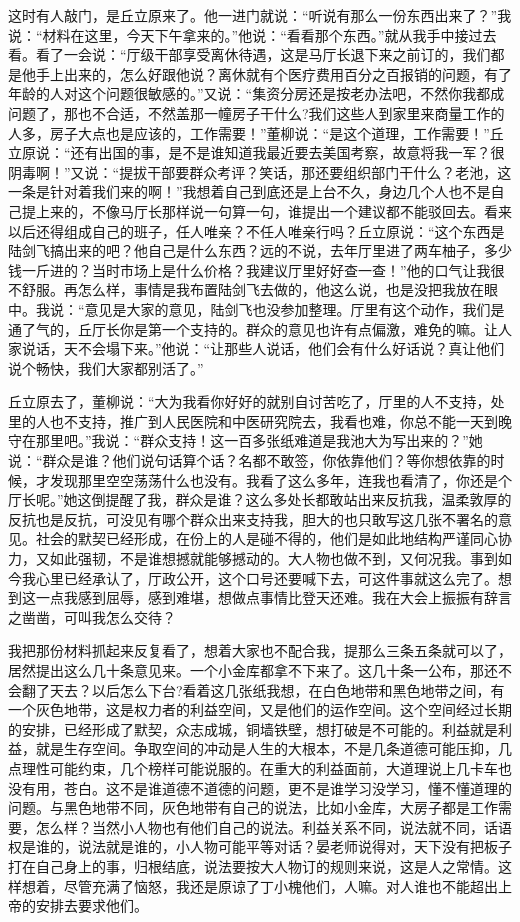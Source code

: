 \documentclass[12pt,oneside]{book}
\begin{document}
这时有人敲门，是丘立原来了。他一进门就说：``听说有那么一份东西出来了？''我说：``材料在这里，今天下午拿来的。''他说：``看看那个东西。''就从我手中接过去看。看了一会说：``厅级干部享受离休待遇，这是马厅长退下来之前订的，我们都是他手上出来的，怎么好跟他说？离休就有个医疗费用百分之百报销的问题，有了年龄的人对这个问题很敏感的。''又说：``集资分房还是按老办法吧，不然你我都成问题了，那也不合适，不然盖那一幢房子干什么?我们这些人到家里来商量工作的人多，房子大点也是应该的，工作需要！''董柳说：``是这个道理，工作需要！''丘立原说：``还有出国的事，是不是谁知道我最近要去美国考察，故意将我一军？很阴毒啊！''又说：``提拔干部要群众考评？笑话，那还要组织部门干什么？老池，这一条是针对着我们来的啊！''我想着自己到底还是上台不久，身边几个人也不是自己提上来的，不像马厅长那样说一句算一句，谁提出一个建议都不能驳回去。看来以后还得组成自己的班子，任人唯亲？不任人唯亲行吗？丘立原说：``这个东西是陆剑飞搞出来的吧？他自己是什么东西？远的不说，去年厅里进了两车柚子，多少钱一斤进的？当时市场上是什么价格？我建议厅里好好查一查！''他的口气让我很不舒服。再怎么样，事情是我布置陆剑飞去做的，他这么说，也是没把我放在眼中。我说：``意见是大家的意见，陆剑飞也没参加整理。厅里有这个动作，我们是通了气的，丘厅长你是第一个支持的。群众的意见也许有点偏激，难免的嘛。让人家说话，天不会塌下来。''他说：``让那些人说话，他们会有什么好话说？真让他们说个畅快，我们大家都别活了。''

丘立原去了，董柳说：``大为我看你好好的就别自讨苦吃了，厅里的人不支持，处里的人也不支持，推广到人民医院和中医研究院去，我看也难，你总不能一天到晚守在那里吧。''我说：``群众支持！这一百多张纸难道是我池大为写出来的？''她说：``群众是谁？他们说句话算个话？名都不敢签，你依靠他们？等你想依靠的时候，才发现那里空空荡荡什么也没有。我看了这么多年，连我也看清了，你还是个厅长呢。''她这倒提醒了我，群众是谁？这么多处长都敢站出来反抗我，温柔敦厚的反抗也是反抗，可没见有哪个群众出来支持我，胆大的也只敢写这几张不署名的意见。社会的默契已经形成，在份上的人是碰不得的，他们是如此地结构严谨同心协力，又如此强韧，不是谁想撼就能够撼动的。大人物也做不到，又何况我。事到如今我心里已经承认了，厅政公开，这个口号还要喊下去，可这件事就这么完了。想到这一点我感到屈辱，感到难堪，想做点事情比登天还难。我在大会上振振有辞言之凿凿，可叫我怎么交待？

我把那份材料抓起来反复看了，想着大家也不配合我，提那么三条五条就可以了，居然提出这么几十条意见来。一个小金库都拿不下来了。这几十条一公布，那还不会翻了天去？以后怎么下台?看着这几张纸我想，在白色地带和黑色地带之间，有一个灰色地带，这是权力者的利益空间，又是他们的运作空间。这个空间经过长期的安排，已经形成了默契，众志成城，铜墙铁壁，想打破是不可能的。利益就是利益，就是生存空间。争取空间的冲动是人生的大根本，不是几条道德可能压抑，几点理性可能约束，几个榜样可能说服的。在重大的利益面前，大道理说上几卡车也没有用，苍白。这不是谁道德不道德的问题，更不是谁学习没学习，懂不懂道理的问题。与黑色地带不同，灰色地带有自己的说法，比如小金库，大房子都是工作需要，怎么样？当然小人物也有他们自己的说法。利益关系不同，说法就不同，话语权是谁的，说法就是谁的，小人物可能平等对话？晏老师说得对，天下没有把板子打在自己身上的事，归根结底，说法要按大人物订的规则来说，这是人之常情。这样想着，尽管充满了恼怒，我还是原谅了丁小槐他们，人嘛。对人谁也不能超出上帝的安排去要求他们。
\end{document}
